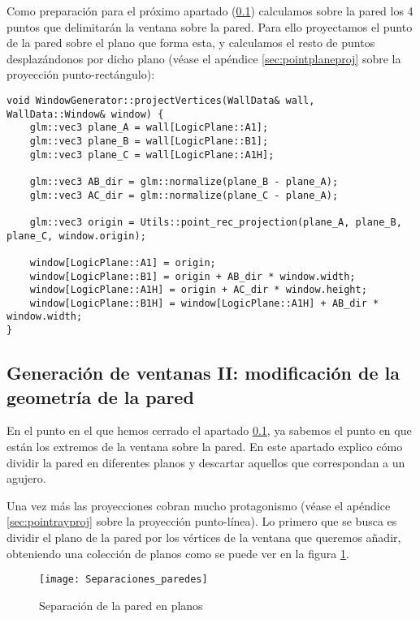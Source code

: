 Como preparación para el próximo apartado (\ref{sec:wallgenwindowsii}) calculamos sobre la pared los 4 puntos que delimitarán la ventana sobre la pared. Para ello proyectamos el punto de la pared sobre el plano que forma esta, y calculamos el resto de puntos desplazándonos por dicho plano (véase el apéndice \ref{sec:pointplaneproj} sobre la proyección punto-rectángulo):

\begin{lstlisting}
void WindowGenerator::projectVertices(WallData& wall, WallData::Window& window) {
	glm::vec3 plane_A = wall[LogicPlane::A1];
	glm::vec3 plane_B = wall[LogicPlane::B1];
	glm::vec3 plane_C = wall[LogicPlane::A1H];

	glm::vec3 AB_dir = glm::normalize(plane_B - plane_A);
	glm::vec3 AC_dir = glm::normalize(plane_C - plane_A);

	glm::vec3 origin = Utils::point_rec_projection(plane_A, plane_B, plane_C, window.origin);

	window[LogicPlane::A1] = origin;
	window[LogicPlane::B1] = origin + AB_dir * window.width;
	window[LogicPlane::A1H] = origin + AC_dir * window.height;
	window[LogicPlane::B1H] = window[LogicPlane::A1H] + AB_dir * window.width;
}
\end{lstlisting}

\subsection{Generación de ventanas II: modificación de la geometría de la pared}
\label{sec:wallgenwindowsii}

En el punto en el que hemos cerrado el apartado \ref{sec:wallgenwindowsii}, ya sabemos el punto en que están los extremos de la ventana sobre la pared. En este apartado explico cómo dividir la pared en diferentes planos y descartar aquellos que correspondan a un agujero.

Una vez más las proyecciones cobran mucho protagonismo (véase el apéndice \ref{sec:pointrayproj} sobre la proyección punto-línea). Lo primero que se busca es dividir el plano de la pared por los vértices de la ventana que queremos añadir, obteniendo una colección de planos como se puede ver en la figura \ref{fig:wall_separacion}.

\begin{figure}[H]
    \centering
    \texttt{[image: Separaciones\_paredes]}
    \caption{Separación de la pared en planos}
    \label{fig:wall_separacion}
\end{figure}

